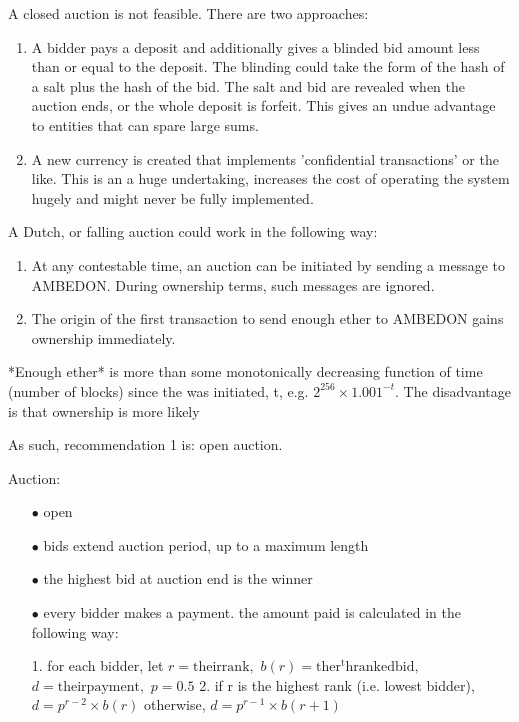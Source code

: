 \documentclass[10pt,a4paper]{article}
\begin{document}
{A closed auction is not feasible. There are two approaches:

\begin{enumerate}
\item A bidder pays a deposit and additionally gives a blinded bid amount less than or equal to the deposit. The blinding could take the form of the hash of a salt plus the hash of the bid. The salt and bid are revealed when the auction ends, or the whole deposit is forfeit. This gives an undue advantage to entities that can spare large sums.
\item A new currency is created that implements 'confidential transactions' or the like. This is an a huge undertaking, increases the cost of operating the system hugely and might never be fully implemented.
\end{enumerate}

A Dutch, or falling auction could work in the following way:

\begin{enumerate}
\item At any contestable time, an auction can be initiated by sending a message to AMBEDON. During ownership terms, such messages are ignored.
\item The origin of the first transaction to send enough ether to AMBEDON gains ownership immediately.
\end{enumerate}

*Enough ether* is more than some monotonically decreasing function of time (number of blocks) since the was initiated, t, e.g. $2^256 \times 1.001^{-t}$. The disadvantage is that ownership is more likely 


As such, recommendation 1 is: open auction.

Auction:

\begin{enumerate}
\item[$\bullet$] open
\item[$\bullet$] bids extend auction period, up to a maximum length
\item[$\bullet$] the highest bid at auction end is the winner
\item[$\bullet$] every bidder makes a payment. the amount paid is calculated in the following way:

	1. for each bidder, let 
		$r = \mathrm{their rank},$
		$b(r) = \mathrm{the r^th ranked bid},$
		$d = \mathrm{their payment},$
		$p = 0.5$
	2. if r is the highest rank (i.e. lowest bidder),
		$d = p^{r - 2} \times b(r)$
	   otherwise, 
		$d = p^{r - 1} \times b(r + 1)$
		

\end{enumerate}}
\end{document}
